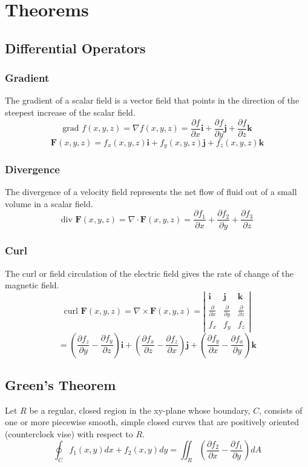 \section{Theorems}
\subsection{Differential Operators}
\subsubsection{Gradient}
The gradient of a scalar field is a vector field that points in the direction of the steepest increase of the scalar field.
$$\text{grad }f(x,y,z)=\nabla f(x,y,z)=\frac{ \partial f }{ \partial x } \mathbf{i}+\frac{ \partial f }{ \partial y } \mathbf{j}+\frac{ \partial f }{ \partial z } \mathbf{k}$$
$$\mathbf{F}(x,y,z)=f_x(x,y,z)\mathbf{i}+f_y(x,y,z)\mathbf{j}+f_z(x,y,z)\mathbf{k}$$

\subsubsection{Divergence}
The divergence of a velocity field represents the net flow of fluid out of a small volume in a scalar field.
$$\text{div }\mathbf{F}(x,y,z)=\nabla \cdot \mathbf{F}(x,y,z)=\frac{ \partial f_{1} }{ \partial x } +\frac{ \partial f_{2} }{ \partial y } +\frac{ \partial f_{3} }{ \partial z } $$

\subsubsection{Curl}
The curl or field circulation of the electric field gives the rate of change of the magnetic field.
$$\text{curl }\mathbf{F}(x,y,z)
=\nabla \times \mathbf{F}(x,y,z)
=\left|\begin{array}{ccc}\mathbf{i} & \mathbf{j} & \mathbf{k} \\ \frac{ \partial  }{ \partial x } & \frac{ \partial  }{ \partial y } & \frac{ \partial  }{ \partial z } \\ f_{x} & f_{y} & f_{z} \end{array}\right|$$
$$=\left(\frac{ \partial f_{z} }{ \partial y } -\frac{ \partial f_{y} }{ \partial z } \right)\mathbf{i}+\left(\frac{ \partial f_{x} }{ \partial z } -\frac{ \partial f_{z} }{ \partial x } \right)\mathbf{j}+\left(\frac{ \partial f_{y} }{ \partial x } -\frac{ \partial f_{x} }{ \partial y } \right)\mathbf{k}$$

\subsection{Green's Theorem}
Let $R$ be a regular, closed region in the xy-plane whose boundary, $C$, consists of one or more piecewise smooth, simple closed curves that are positively oriented (counterclock vise) with respect to $R$.
$$\oint_{ C } f_1(x, y) d x+f_2(x, y) d y=\iint_{ R }\left(\frac{\partial f_2}{\partial x}-\frac{\partial f_1}{\partial y}\right) d A$$

